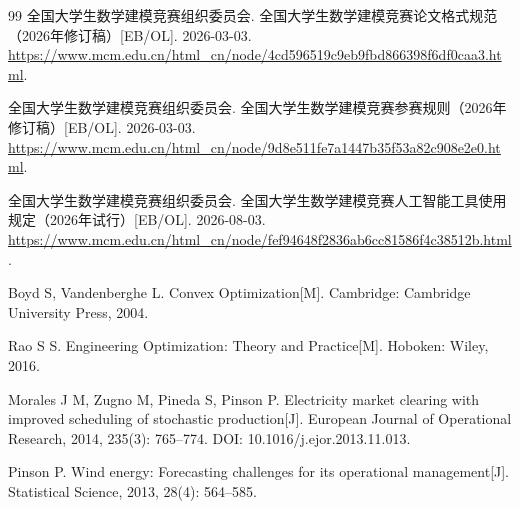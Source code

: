\documentclass[withoutpreface]{cumcmthesis}
\begin{document}
\begin{thebibliography}{99}
全国大学生数学建模竞赛组织委员会. 全国大学生数学建模竞赛论文格式规范（2026年修订稿）[EB/OL]. 2026-03-03. \url{https://www.mcm.edu.cn/html_cn/node/4cd596519c9eb9fbd866398f6df0caa3.html}.

全国大学生数学建模竞赛组织委员会. 全国大学生数学建模竞赛参赛规则（2026年修订稿）[EB/OL]. 2026-03-03. \url{https://www.mcm.edu.cn/html_cn/node/9d8e511fe7a1447b35f53a82c908e2e0.html}.

全国大学生数学建模竞赛组织委员会. 全国大学生数学建模竞赛人工智能工具使用规定（2026年试行）[EB/OL]. 2026-08-03. \url{https://www.mcm.edu.cn/html_cn/node/fef94648f2836ab6cc81586f4c38512b.html}.

Boyd S, Vandenberghe L. Convex Optimization[M]. Cambridge: Cambridge University Press, 2004.

Rao S S. Engineering Optimization: Theory and Practice[M]. Hoboken: Wiley, 2016.

Morales J M, Zugno M, Pineda S, Pinson P. Electricity market clearing with improved scheduling of stochastic production[J]. European Journal of Operational Research, 2014, 235(3): 765--774. DOI: 10.1016/j.ejor.2013.11.013.

Pinson P. Wind energy: Forecasting challenges for its operational management[J]. Statistical Science, 2013, 28(4): 564--585.

\end{thebibliography}
\end{document}
